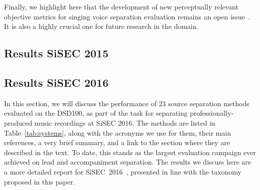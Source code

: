 Finally, we highlight here that the development of new perceptually relevant objective metrics for singing voice separation evaluation remains an open issue~\cite{gupta15}. It is also a highly crucial one for future research in the domain.

\subsection{Results SiSEC 2015}
\label{ssec:performance}

\kant[1-16]

\subsection{Results SiSEC 2016}
\label{ssec:performance}

In this section, we will discuss the performance of $23$ source separation methods evaluated on the DSD100, as part of the task for separating professionally-produced music recordings at SiSEC 2016. The methods are listed in Table~\ref{tab:systems}, along with the acronyms we use for them, their main references, a very brief summary, and a link to the section where they are described in the text. To date, this stands as the largest evaluation campaign ever achieved on lead and accompaniment separation. The results we discuss here are a more detailed report for SiSEC~2016~\cite{liutkus17}, presented in line with the taxonomy proposed in this paper.

